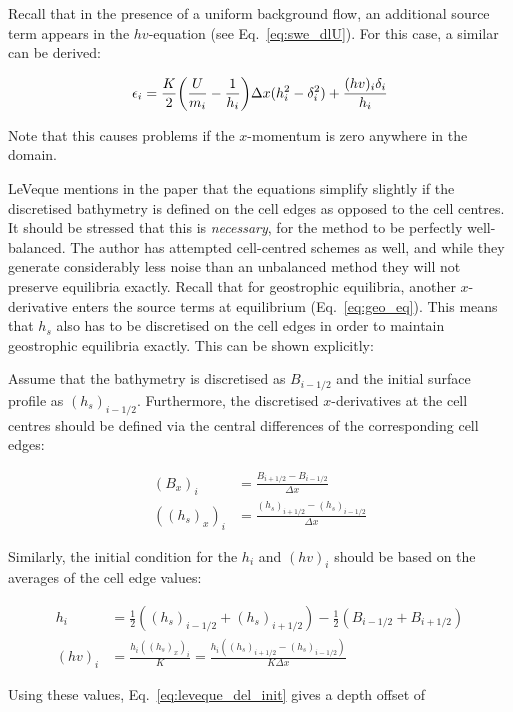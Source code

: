 Recall that in the presence of a uniform background flow, an additional source term appears in the $hv$-equation (see Eq.~\ref{eq:swe_dlU}). For this case, a similar can be derived:

\begin{equation}
  \epsilon_i = \frac{K}{2} \qty(\frac{U}{m_i} - \frac{1}{h_i}) \Delta x(h_i^2 - \delta_i^2) + \frac{(hv)_i \delta_i}{h_i}
\end{equation}

Note that this causes problems if the $x$-momentum is zero anywhere in the domain.

LeVeque mentions in the paper that the equations simplify slightly if the discretised bathymetry is defined on the cell edges as opposed to the cell centres. It should be stressed that this is \emph{necessary}, for the method to be perfectly well-balanced. The author has attempted cell-centred schemes as well, and while they generate considerably less noise than an unbalanced method they will not preserve equilibria exactly. Recall that for geostrophic equilibria, another $x$-derivative enters the source terms at equilibrium (Eq.~\ref{eq:geo_eq}). This means that $h_s$ also has to be discretised on the cell edges in order to maintain geostrophic equilibria exactly. This can be shown explicitly:

Assume that the bathymetry is discretised as $B_{i-1/2}$ and the initial surface profile as $(h_s)_{i-1/2}$. Furthermore, the discretised $x$-derivatives at the cell centres should be defined via the central differences of the corresponding cell edges:

\begin{align}
  (B_x)_i &= \frac{B_{i+1/2}-B_{i-1/2}}{\Delta x} \\
  ((h_s)_x)_i &= \frac{(h_s)_{i+1/2}-(h_s)_{i-1/2}}{\Delta x}
\end{align}

Similarly, the initial condition for the $h_i$ and $(hv)_i$ should be based on the averages of the cell edge values:

\begin{align}
  h_i &= \frac{1}{2}((h_s)_{i-1/2} + (h_s)_{i+1/2}) - \frac{1}{2}(B_{i-1/2} + B_{i+1/2}) \\
  (hv)_i &= \frac{h_i ((h_s)_x)_i}{K} = \frac{h_i ((h_s)_{i+1/2}-(h_s)_{i-1/2})}{K\Delta x}
\end{align}

Using these values, Eq.~\ref{eq:leveque_del_init} gives a depth offset of

